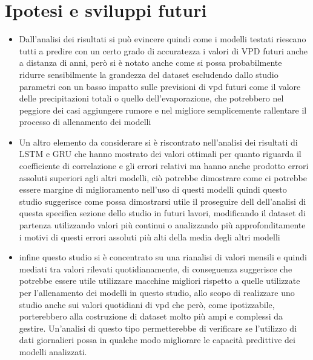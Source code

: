 \section{Ipotesi e sviluppi futuri}
\begin{itemize}
	\item Dall'analisi dei risultati si può evincere quindi come i modelli testati riescano tutti a predire con un certo grado di accuratezza i valori di VPD futuri anche a distanza di anni, però si è notato anche come si possa probabilmente ridurre sensibilmente la grandezza del dataset escludendo dallo studio parametri con un basso impatto sulle previsioni di vpd futuri come il valore delle precipitazioni totali o quello dell'evaporazione, che potrebbero nel peggiore dei casi aggiungere rumore e nel migliore semplicemente rallentare il processo di allenamento dei modelli
	\item Un altro elemento da considerare si è riscontrato nell'analisi dei risultati di LSTM e GRU che hanno mostrato dei valori ottimali per quanto riguarda il coefficiente di correlazione e gli errori relativi ma hanno anche prodotto errori assoluti superiori agli altri modelli, ciò potrebbe dimostrare come ci potrebbe essere margine di miglioramento nell'uso di questi modelli quindi questo studio suggerisce come possa dimostrarsi utile il proseguire dell dell'analisi di questa specifica sezione dello studio in futuri lavori, modificando il dataset di partenza utilizzando valori più continui o analizzando più approfonditamente i motivi di questi errori assoluti più alti della media degli altri modelli
	\item infine questo studio si è concentrato su una rianalisi di valori mensili e quindi mediati tra valori rilevati quotidianamente, di conseguenza suggerisce che potrebbe essere utile utilizzare macchine migliori rispetto a quelle utilizzate per l'allenamento dei modelli in questo studio, allo scopo di realizzare uno studio anche sui valori quotidiani di vpd che però, come ipotizzabile, porterebbero alla costruzione di dataset molto più ampi e complessi da gestire. Un'analisi di questo tipo permetterebbe di verificare se l'utilizzo di dati giornalieri possa in qualche modo migliorare le capacità predittive dei modelli analizzati.
\end{itemize}
\label{sec:conclusion}